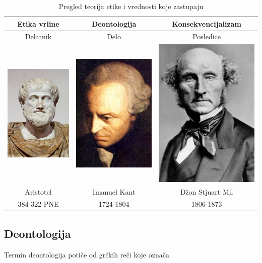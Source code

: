 \documentclass[a4paper]{article}
\begin{document}
\begin{table}
\begin{center}
\caption{Pregled teorija etike i vrednosti koje zastupaju}
\begin{tabular}{|c|c|c|} \hline
Etika vrline & Deontologija & Konsekvencijalizam\\ \hline
Delatnik & Delo & Posledice\\ \hline
\includegraphics[scale=.2]{slike/aristotel.jpg} & \includegraphics[scale=.2]{slike/kant.jpg} & \includegraphics[scale=.2]{slike/mil.jpg} \\Aristotel & Imanuel Kant & Džon Stjuart Mil\\ 384-322 PNE & 1724-1804 & 1806-1873\\ 
\hline
\end{tabular}
\label{tab:tabela1}
\end{center}
\end{table}

\subsection{Deontologija}

Termin deontologija potiče od grčkih reči koje označa
\end{document}
